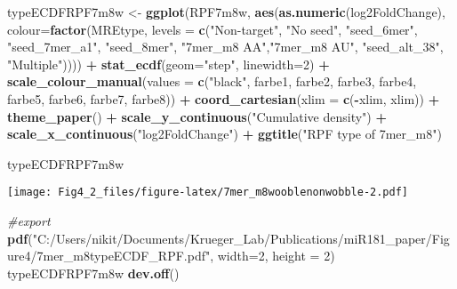 \documentclass[
]{article}
\newenvironment{Shaded}{\begin{snugshade}}{\end{snugshade}}
\newcommand{\AttributeTok}[1]{\textcolor[rgb]{0.13,0.29,0.53}{#1}}
\newcommand{\CommentTok}[1]{\textcolor[rgb]{0.56,0.35,0.01}{\textit{#1}}}
\newcommand{\DecValTok}[1]{\textcolor[rgb]{0.00,0.00,0.81}{#1}}
\newcommand{\FunctionTok}[1]{\textcolor[rgb]{0.13,0.29,0.53}{\textbf{#1}}}
\newcommand{\NormalTok}[1]{#1}
\newcommand{\OtherTok}[1]{\textcolor[rgb]{0.56,0.35,0.01}{#1}}
\newcommand{\SpecialCharTok}[1]{\textcolor[rgb]{0.81,0.36,0.00}{\textbf{#1}}}
\newcommand{\StringTok}[1]{\textcolor[rgb]{0.31,0.60,0.02}{#1}}
\begin{document}
\begin{Shaded}
\begin{Highlighting}[]
\NormalTok{typeECDFRPF7m8w }\OtherTok{\textless{}{-}} \FunctionTok{ggplot}\NormalTok{(RPF7m8w, }\FunctionTok{aes}\NormalTok{(}\FunctionTok{as.numeric}\NormalTok{(log2FoldChange), }
                              \AttributeTok{colour=}\FunctionTok{factor}\NormalTok{(MREtype, }\AttributeTok{levels =} \FunctionTok{c}\NormalTok{(}\StringTok{"Non{-}target"}\NormalTok{, }\StringTok{"No seed"}\NormalTok{, }\StringTok{"seed\_6mer"}\NormalTok{, }\StringTok{"seed\_7mer\_a1"}\NormalTok{, }\StringTok{"seed\_8mer"}\NormalTok{, }\StringTok{"7mer\_m8 AA"}\NormalTok{,}\StringTok{"7mer\_m8 AU"}\NormalTok{, }\StringTok{"seed\_alt\_38"}\NormalTok{, }\StringTok{"Multiple"}\NormalTok{)))) }\SpecialCharTok{+} 
  \FunctionTok{stat\_ecdf}\NormalTok{(}\AttributeTok{geom=}\StringTok{"step"}\NormalTok{, }\AttributeTok{linewidth=}\DecValTok{2}\NormalTok{) }\SpecialCharTok{+}
  \FunctionTok{scale\_colour\_manual}\NormalTok{(}\AttributeTok{values =} \FunctionTok{c}\NormalTok{(}\StringTok{"black"}\NormalTok{, farbe1, farbe2, farbe3, farbe4, farbe5, farbe6, farbe7, farbe8)) }\SpecialCharTok{+}
  \FunctionTok{coord\_cartesian}\NormalTok{(}\AttributeTok{xlim =} \FunctionTok{c}\NormalTok{(}\SpecialCharTok{{-}}\NormalTok{xlim, xlim)) }\SpecialCharTok{+} 
  \FunctionTok{theme\_paper}\NormalTok{() }\SpecialCharTok{+}
  \FunctionTok{scale\_y\_continuous}\NormalTok{(}\StringTok{"Cumulative density"}\NormalTok{) }\SpecialCharTok{+} \FunctionTok{scale\_x\_continuous}\NormalTok{(}\StringTok{"log2FoldChange"}\NormalTok{) }\SpecialCharTok{+}
  \FunctionTok{ggtitle}\NormalTok{(}\StringTok{"RPF type of 7mer\_m8"}\NormalTok{)}

\NormalTok{typeECDFRPF7m8w}
\end{Highlighting}
\end{Shaded}

\texttt{[image: Fig4\_2\_files/figure-latex/7mer\_m8wooblenonwobble-2.pdf]}

\begin{Shaded}
\begin{Highlighting}[]
\CommentTok{\#export}
\FunctionTok{pdf}\NormalTok{(}\StringTok{"C:/Users/nikit/Documents/Krueger\_Lab/Publications/miR181\_paper/Figure4/7mer\_m8typeECDF\_RPF.pdf"}\NormalTok{, }\AttributeTok{width=}\DecValTok{2}\NormalTok{, }\AttributeTok{height =} \DecValTok{2}\NormalTok{)}
\NormalTok{typeECDFRPF7m8w}
\FunctionTok{dev.off}\NormalTok{()}
\end{Highlighting}
\end{Shaded}
\end{document}
